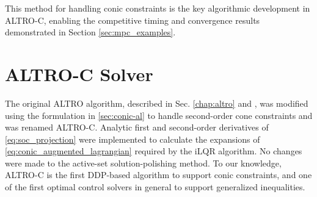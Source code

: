 \documentclass[../root.tex]{subfiles}
\begin{document}
    This method for handling conic constraints is the key algorithmic
    development in ALTRO-C, enabling the competitive timing and convergence
    results demonstrated in Section \ref{sec:mpc_examples}.
    
    
    
    \section{ALTRO-C Solver} 
        
        The original ALTRO algorithm, described in Sec. \ref{chap:altro} and
        \cite{howell_ALTRO_2019}, was modified using the formulation in
        \ref{sec:conic-al} to handle second-order cone constraints and was
        renamed ALTRO-C. Analytic first and second-order derivatives of
        \eqref{eq:soc_projection} were implemented to calculate the
        expansions of \eqref{eq:conic_augmented_lagrangian} required by the
        iLQR algorithm. No changes were made to the active-set
        solution-polishing method. To our knowledge, ALTRO-C is the first
        DDP-based algorithm to support conic constraints, and one of the
        first optimal control solvers in general to support generalized
        inequalities.
\end{document}
